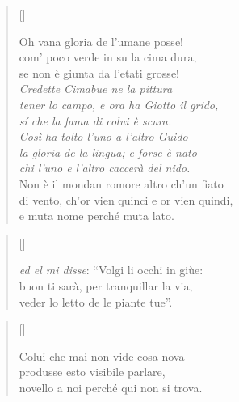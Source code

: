 \documentclass{article}
\begin{document}
\begin{verse}[\versewidth]
  \begin{patverse*}
    Oh vana gloria de l'umane posse!\\
    com' poco verde in su la cima dura,\\
    se non è giunta da l'etati grosse!\\
    \emph{Credette Cimabue ne la pittura\\
    tener lo campo, e ora ha Giotto il grido,\\
    sí che la fama di colui è scura.\\
    Così ha tolto l'uno a l'altro Guido\\
    la gloria de la lingua; e forse è nato\\
    chi l'uno e l'altro caccerà del nido.}\\
    Non è il mondan romore altro ch'un fiato\\
    di vento, ch'or vien quinci e or vien quindi,\\
    e muta nome perché muta lato.
  \end{patverse*}
\end{verse}

\begin{verse}[\versewidth]
  \begin{patverse*}
    \emph{ed el mi disse}: ``Volgi li occhi in giùe:\\
    buon ti sarà, per tranquillar la via,\\
    veder lo letto de le piante tue''.
  \end{patverse*}
\end{verse}

\begin{verse}[\versewidth]
  \begin{patverse*}
    Colui che mai non vide cosa nova\\
    produsse esto visibile parlare,\\
    novello a noi perché qui non si trova.
  \end{patverse*}
\end{verse}
\end{document}
